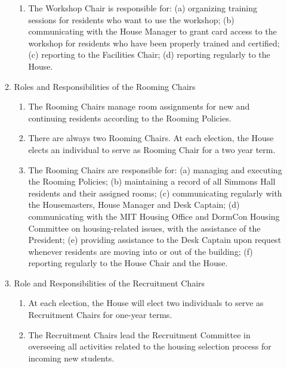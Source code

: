 \documentclass[letterpaper]{article}
\begin{document}
\begin{enumerate}
\begin{enumerate}
\begin{enumerate}
\item The Workshop Chair is responsible for: (a) organizing training sessions for residents who want to use the workshop; (b) communicating with the House Manager to grant card access to the workshop for residents who have been properly trained and certified; (c) reporting to the Facilities Chair; (d) reporting regularly to the House.

\end{enumerate}

\item Roles and Responsibilities of the Rooming Chairs

\begin{enumerate}

\item The Rooming Chairs manage room assignments for new and continuing residents according to the Rooming Policies.

\item There are always two Rooming Chairs. At each election, the House elects an individual to serve as Rooming Chair for a two year term.

\item The Rooming Chairs are responsible for: (a) managing and executing the Rooming Policies; (b) maintaining a record of all Simmons Hall residents and their assigned rooms; (c) communicating regularly with the Housemasters, House Manager and Desk Captain; (d) communicating with the MIT Housing Office and DormCon Housing Committee on housing-related issues, with the assistance of the President; (e) providing assistance to the Desk Captain upon request whenever residents are moving into or out of the building; (f) reporting regularly to the House Chair and the House.

\end{enumerate}

\item Role and Responsibilities of the Recruitment Chairs

\begin{enumerate}

\item At each election, the House will elect two individuals to serve as Recruitment Chairs for one-year terms.

\item The Recruitment Chairs lead the Recruitment Committee in overseeing all activities related to the housing selection process for incoming new students.


\end{enumerate}
\end{enumerate}
\end{enumerate}
\end{document}

